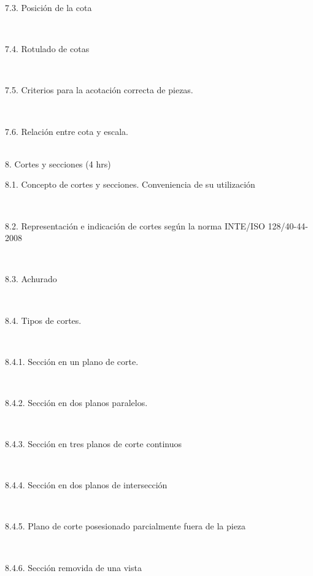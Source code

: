\documentclass[letterpaper]{article}%
\begin{document}
\hspace*{0.02\linewidth}\parbox{0.98\linewidth}{\strut 7.3. Posición de la cota\strut}\\
\hspace*{0.02\linewidth}\parbox{0.98\linewidth}{\strut 7.4. Rotulado de cotas\strut}\\
\hspace*{0.02\linewidth}\parbox{0.98\linewidth}{\strut 7.5. Criterios para la acotación correcta de piezas.\strut}\\
\hspace*{0.02\linewidth}\parbox{0.98\linewidth}{\strut 7.6. Relación entre cota y escala.\strut}\\
8. Cortes y secciones (4 hrs)\\
\hspace*{0.02\linewidth}\parbox{0.98\linewidth}{\strut 8.1. Concepto de cortes y secciones. Conveniencia de su utilización\strut}\\
\hspace*{0.02\linewidth}\parbox{0.98\linewidth}{\strut 8.2. Representación e indicación de cortes según la norma INTE/ISO 128/40-44- 2008\strut}\\
\hspace*{0.02\linewidth}\parbox{0.98\linewidth}{\strut 8.3. Achurado\strut}\\
\hspace*{0.02\linewidth}\parbox{0.98\linewidth}{\strut 8.4. Tipos de cortes.\strut}\\
\hspace*{0.04\linewidth}\parbox{0.96\linewidth}{\strut 8.4.1. Sección en un plano de corte.\strut}\\
\hspace*{0.04\linewidth}\parbox{0.96\linewidth}{\strut 8.4.2. Sección en dos planos paralelos.\strut}\\
\hspace*{0.04\linewidth}\parbox{0.96\linewidth}{\strut 8.4.3. Sección en tres planos de corte continuos\strut}\\
\hspace*{0.04\linewidth}\parbox{0.96\linewidth}{\strut 8.4.4. Sección en dos planos de intersección\strut}\\
\hspace*{0.04\linewidth}\parbox{0.96\linewidth}{\strut 8.4.5. Plano de corte posesionado parcialmente fuera de la pieza\strut}\\
\hspace*{0.04\linewidth}\parbox{0.96\linewidth}{\strut 8.4.6. Sección removida de una vista\strut}\\
\end{document}
